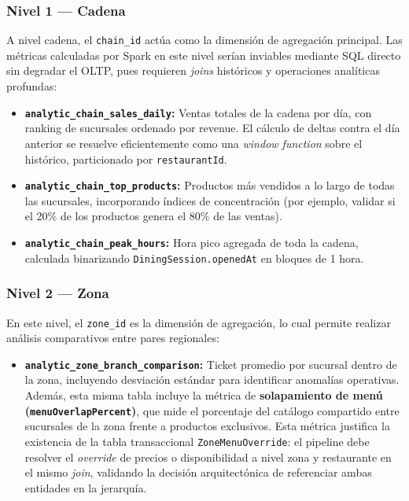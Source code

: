 \subsubsection{Nivel 1 --- Cadena}
A nivel cadena, el \texttt{chain\_id} actúa como la dimensión de agregación principal. Las métricas calculadas por Spark en este nivel serían inviables mediante SQL directo sin degradar el OLTP, pues requieren \textit{joins} históricos y operaciones analíticas profundas:

\begin{itemize}[leftmargin=1.5em]
  \item \textbf{\texttt{analytic\_chain\_sales\_daily}:} Ventas totales de la cadena por día, con ranking de sucursales ordenado por revenue. El cálculo de deltas contra el día anterior se resuelve eficientemente como una \textit{window function} sobre el histórico, particionado por \texttt{restaurantId}.
  \item \textbf{\texttt{analytic\_chain\_top\_products}:} Productos más vendidos a lo largo de todas las sucursales, incorporando índices de concentración (por ejemplo, validar si el 20\% de los productos genera el 80\% de las ventas).
  \item \textbf{\texttt{analytic\_chain\_peak\_hours}:} Hora pico agregada de toda la cadena, calculada binarizando \texttt{DiningSession.openedAt} en bloques de 1 hora.
\end{itemize}

\subsubsection{Nivel 2 --- Zona}
En este nivel, el \texttt{zone\_id} es la dimensión de agregación, lo cual permite realizar análisis comparativos entre pares regionales:

\begin{itemize}[leftmargin=1.5em]
  \item \textbf{\texttt{analytic\_zone\_branch\_comparison}:} Ticket promedio por sucursal dentro de la zona, incluyendo desviación estándar para identificar anomalías operativas. Además, esta misma tabla incluye la métrica de \textbf{solapamiento de menú (\texttt{menuOverlapPercent})}, que mide el porcentaje del catálogo compartido entre sucursales de la zona frente a productos exclusivos. Esta métrica justifica la existencia de la tabla transaccional \texttt{ZoneMenuOverride}: el pipeline debe resolver el \textit{override} de precios o disponibilidad a nivel zona y restaurante en el mismo \textit{join}, validando la decisión arquitectónica de referenciar ambas entidades en la jerarquía.
\end{itemize}

